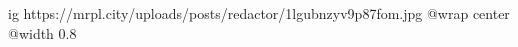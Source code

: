  
 
 
 
 

\ifcmt
  ig https://mrpl.city/uploads/posts/redactor/1lgubnzyv9p87fom.jpg
  @wrap center
  @width 0.8
\fi
